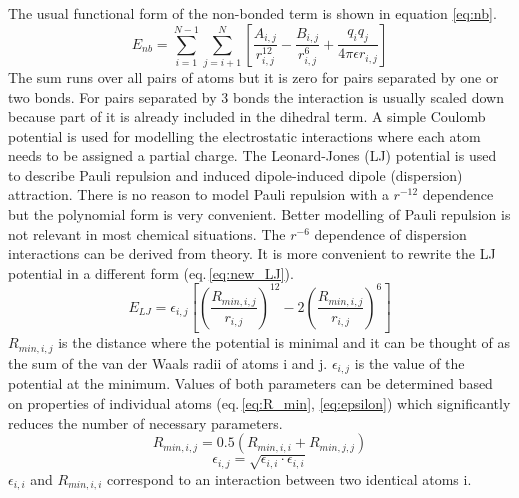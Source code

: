 The usual functional form of the non-bonded term is shown in equation \ref{eq:nb}.
\begin{equation} \label{eq:nb}
    E_{nb} = \sum_{i=1}^{N-1} \sum_{j=i+1}^{N} \left[ \frac{A_{i,j}}{r_{i,j}^{12}} - \frac{B_{i,j}}{r_{i,j}^{6}} + \frac{q_i q_j}{4 \pi \epsilon r_{i,j}} \right]
\end{equation}
The sum runs over all pairs of atoms but it is zero for pairs separated by one or two bonds. For pairs separated by 3 bonds the interaction is usually scaled down because part of it is already included in the dihedral term. A simple Coulomb potential is used for modelling the electrostatic interactions where each atom needs to be assigned a partial charge. The Leonard-Jones (LJ) potential is used to describe Pauli repulsion and induced dipole-induced dipole (dispersion) attraction. There is no reason to model Pauli repulsion with a $r^{-12}$ dependence but the polynomial form is very convenient. Better modelling of Pauli repulsion is not relevant in most chemical situations. The $r^{-6}$ dependence of dispersion interactions can be derived from theory. It is more convenient to rewrite the LJ potential in a different form (eq.\,\ref{eq:new_LJ}).
\begin{equation} \label{eq:new_LJ}
    E_{LJ} = \epsilon_{i,j} \left[ \left( \frac{R_{min,i,j}}{r_{i,j}} \right)^{12} - 2 \left( \frac{R_{min,i,j}}{r_{i,j}} \right)^6 \right]
\end{equation}
$R_{min,i,j}$ is the distance where the potential is minimal and it can be thought of as the sum of the van der Waals radii of atoms i and j. $\epsilon_{i,j}$ is the value of the potential at the minimum. Values of both parameters can be determined based on properties of individual atoms (eq.\,\ref{eq:R_min}, \ref{eq:epsilon})  which significantly reduces the number of necessary parameters.  
\begin{equation} \label{eq:R_min}
    R_{min,i,j} = 0.5(R_{min,i,i} + R_{min,j,j})
\end{equation}
\begin{equation} \label{eq:epsilon}
    \epsilon_{i,j} = \sqrt{\epsilon_{i,i} \cdot \epsilon_{i,i}}
\end{equation}
$\epsilon_{i,i}$ and $R_{min,i,i}$ correspond to an interaction between two identical atoms i. 

